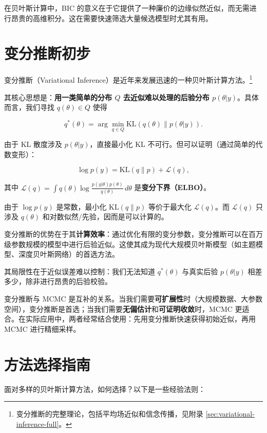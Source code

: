 在贝叶斯计算中，BIC 的意义在于它提供了一种廉价的边缘似然近似，而无需进行昂贵的高维积分。这在需要快速筛选大量候选模型时尤其有用。

\section{变分推断初步}

变分推断（Variational Inference）是近年来发展迅速的一种贝叶斯计算方法。\footnote{变分推断的完整理论，包括平均场近似和信念传播，见附录 \cref{sec:variational-inference-full}。}

其核心思想是：\textbf{用一类简单的分布 $Q$ 去近似难以处理的后验分布 $p(\theta | y)$}。具体而言，我们寻找 $q(\theta) \in Q$ 使得

\[
q^*(\theta) = \arg\min_{q \in Q} \text{KL}(q(\theta) \| p(\theta | y)).
\]

由于 KL 散度涉及 $p(\theta | y)$，直接最小化 KL 不可行。但可以证明（通过简单的代数变形）：

\[
\log p(y) = \text{KL}(q \| p) + \mathcal{L}(q),
\]

其中 $\mathcal{L}(q) = \int q(\theta) \log \frac{p(y | \theta) p(\theta)}{q(\theta)} \, d\theta$ 是\textbf{变分下界（ELBO）}。

由于 $\log p(y)$ 是常数，最小化 $\text{KL}(q \| p)$ 等价于最大化 $\mathcal{L}(q)$。而 $\mathcal{L}(q)$ 只涉及 $q(\theta)$ 和对数似然/先验，因而是可以计算的。

变分推断的优势在于其\textbf{计算效率}：通过优化有限的变分参数，变分推断可以在百万级参数规模的模型中进行后验近似。这使其成为现代大规模贝叶斯模型（如主题模型、深度贝叶斯网络）的首选方法。

其局限性在于近似误差难以控制：我们无法知道 $q^*(\theta)$ 与真实后验 $p(\theta | y)$ 相差多少，除非进行昂贵的后验校验。

\begin{Remark}
  变分推断与 MCMC 是互补的关系。当我们需要\textbf{可扩展性}时（大规模数据、大参数空间），变分推断是首选；当我们需要\textbf{无偏估计}和\textbf{可证明收敛}时，MCMC 更适合。在实际应用中，两者经常结合使用：先用变分推断快速获得初始近似，再用 MCMC 进行精细采样。
\end{Remark}

\section{方法选择指南}

面对多样的贝叶斯计算方法，如何选择？以下是一些经验法则：

